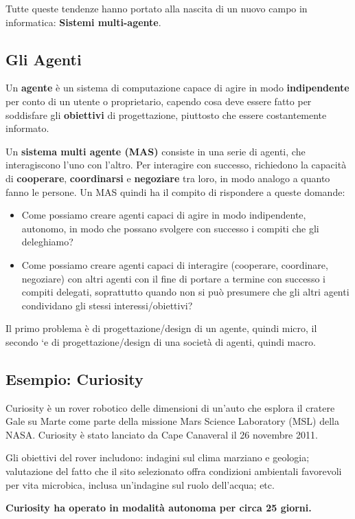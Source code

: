 Tutte queste tendenze hanno portato alla nascita di un nuovo campo in informatica: \textbf{Sistemi multi-agente}.

\subsection{Gli Agenti}
Un \textbf{agente} è un sistema di computazione capace di agire in modo \textbf{indipendente} per conto di un utente o proprietario, capendo cosa deve essere fatto per soddisfare gli \textbf{obiettivi} di progettazione, piuttosto che essere costantemente informato.

Un \textbf{sistema multi agente (MAS)} consiste in una serie di agenti, che interagiscono l’uno con l’altro. Per interagire con successo, richiedono la capacità di \textbf{cooperare}, \textbf{coordinarsi} e \textbf{negoziare} tra loro, in modo analogo a quanto fanno le persone. Un MAS quindi ha il compito di rispondere a queste domande:
\begin{itemize}
    \item Come possiamo creare agenti capaci di agire in modo indipendente, autonomo, in
    modo che possano svolgere con successo i compiti che gli deleghiamo?
    \item Come possiamo creare agenti capaci di interagire (cooperare, coordinare,
    negoziare) con altri agenti con il fine di portare a termine con successo i compiti
    delegati, soprattutto quando non si può presumere che gli altri agenti condividano
    gli stessi interessi/obiettivi?
\end{itemize}

Il primo problema è di progettazione/design di un agente, quindi micro, il secondo `e di progettazione/design di una società di agenti, quindi macro.

\subsection{Esempio: Curiosity}
Curiosity è un rover robotico delle dimensioni di un’auto che esplora il cratere Gale su Marte come parte della missione Mars Science Laboratory (MSL) della NASA. Curiosity è stato lanciato da Cape Canaveral il 26 novembre 2011.

Gli obiettivi del rover includono: indagini sul clima marziano e geologia; valutazione del fatto che il sito selezionato offra condizioni ambientali favorevoli per vita microbica, inclusa un’indagine sul ruolo dell’acqua; etc.

\textbf{Curiosity ha operato in modalità autonoma per circa 25 giorni.}

